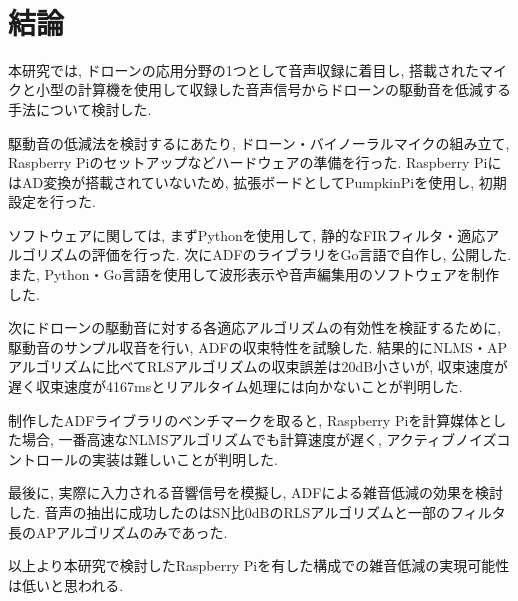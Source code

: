 \
\chapter{結論}\label{conclusion}

本研究では, ドローンの応用分野の1つとして音声収録に着目し, 搭載されたマイクと小型の計算機を使用して収録した音声信号からドローンの駆動音を低減する手法について検討した. 

駆動音の低減法を検討するにあたり, ドローン・バイノーラルマイクの組み立て, Raspberry Piのセットアップなどハードウェアの準備を行った.  Raspberry PiにはAD変換が搭載されていないため, 拡張ボードとしてPumpkinPiを使用し, 初期設定を行った. 

ソフトウェアに関しては, まずPythonを使用して, 静的なFIRフィルタ・適応アルゴリズムの評価を行った. 次にADFのライブラリをGo言語で自作し, 公開した. また, Python・Go言語を使用して波形表示や音声編集用のソフトウェアを制作した. 

次にドローンの駆動音に対する各適応アルゴリズムの有効性を検証するために, 駆動音のサンプル収音を行い, ADFの収束特性を試験した. 結果的にNLMS・APアルゴリズムに比べてRLSアルゴリズムの収束誤差は20dB小さいが, 収束速度が遅く収束速度が4167msとリアルタイム処理には向かないことが判明した. 

制作したADFライブラリのベンチマークを取ると, Raspberry Piを計算媒体とした場合, 一番高速なNLMSアルゴリズムでも計算速度が遅く, アクティブノイズコントロールの実装は難しいことが判明した. 

最後に, 実際に入力される音響信号を模擬し, ADFによる雑音低減の効果を検討した. 音声の抽出に成功したのはSN比0dBのRLSアルゴリズムと一部のフィルタ長のAPアルゴリズムのみであった. 

以上より本研究で検討したRaspberry Piを有した構成での雑音低減の実現可能性は低いと思われる. 
